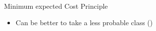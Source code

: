 \documentclass[11pt,compress,t,notes=noshow, xcolor=table]{beamer}
\begin{document}
\begin{vbframe}{Minimum expected Cost Principle}
\begin{itemize}
        \item Can be better to take a less probable class (\href{https://dl.acm.org/doi/10.5555/1642194.1642224}{})

    \end{itemize}
\end{vbframe}
\end{document}
